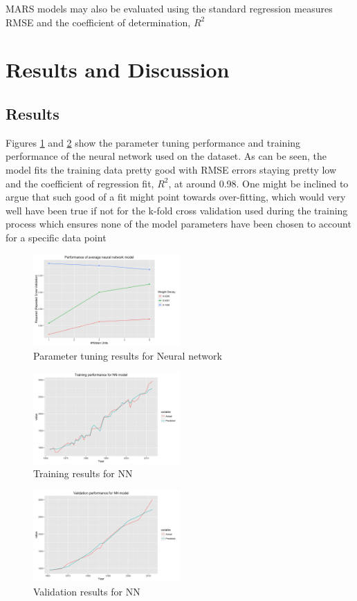 \documentclass[conference]{IEEEtran}
\begin{document}
MARS models may also be evaluated using the standard regression measures RMSE and the coefficient of determination, $R^2$

\section{Results and Discussion}
\subsection{Results}
Figures \ref{res:ann_tune} and \ref{res:ann_train} show the parameter tuning performance and training performance of the neural network used on the dataset. As can be seen, the model fits the training data pretty good with RMSE errors staying pretty low and the coefficient of regression fit, $R^2$, at around 0.98. One might be inclined to argue that such good of a fit might point towards over-fitting, which would very well have been true if not for the k-fold cross validation used during the training process which ensures none of the model parameters have been chosen to account for a specific data point
\begin{figure}[!h]
    \centering
    \includegraphics[width=0.5\textwidth]{avgnnet_rsqr.png}
    \caption{Parameter tuning results for Neural network}
    \label{res:ann_tune}
\end{figure}
\begin{figure}[!h]
    \centering
    \includegraphics[width=0.5\textwidth]{avgnnet_training.png}
    \caption{Training results for NN}
    \label{res:ann_train}
\end{figure}
\begin{figure}[!h]
    \centering
    \includegraphics[width=0.5\textwidth]{avgnnet_validate.png}
    \caption{Validation results for NN}
    \label{res:ann_test}
\end{figure}
\end{document}

